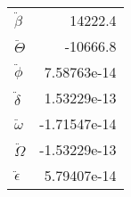 \begin{tabular}{lr}
\hline
 $\ddot{\beta}$    &  14222.4         \\
 $\ddot{\Theta}$   & -10666.8         \\
 $\ddot{\phi}$     &      7.58763e-14 \\
 $\ddot{\delta}$   &      1.53229e-13 \\
 $\ddot{\omega}$   &     -1.71547e-14 \\
 $\ddot{\Omega}$   &     -1.53229e-13 \\
 $\ddot{\epsilon}$ &      5.79407e-14 \\
\hline
\end{tabular}